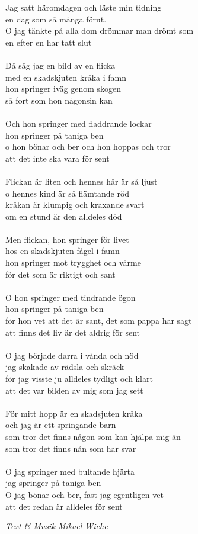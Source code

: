 \vspace{10pt}
Jag satt häromdagen och läste min tidning\\
en dag som så många förut.\\
O jag tänkte på alla dom drömmar man drömt som\\
en efter en har tatt slut\\
\\
Då såg jag en bild av en flicka\\
med en skadskjuten kråka i famn\\
hon springer iväg genom skogen\\
så fort som hon någonsin kan\\
\\
Och hon springer med fladdrande lockar\\
hon springer på taniga ben\\
o hon bönar och ber och hon hoppas och tror\\
att det inte ska vara för sent\\
\\
Flickan är liten och hennes hår är så ljust\\
o hennes kind är så flämtande röd\\
kråkan är klumpig och kraxande svart\\
om en stund är den alldeles död\\
\\
Men flickan, hon springer för livet\\
hos en skadskjuten fågel i famn\\
hon springer mot trygghet och värme\\
för det som är riktigt och sant\\
\\
O hon springer med tindrande ögon\\
hon springer på taniga ben\\
för hon vet att det är sant, det som pappa har sagt\\
att finns det liv är det aldrig för sent\\
\\
O jag började darra i vånda och nöd\\
jag skakade av rädsla och skräck\\
för jag visste ju alldeles tydligt och klart\\
att det var bilden av mig som jag sett\\
\\
För mitt hopp är en skadsjuten kråka\\
och jag är ett springande barn\\
som tror det finns någon som kan hjälpa mig än\\
som tror det finns nån som har svar\\
\\
O jag springer med bultande hjärta\\
jag springer på taniga ben\\
O jag bönar och ber, fast jag egentligen vet\\
att det redan är alldeles för sent
\par
\vspace{10pt}
{\footnotesize\textit{Text \& Musik Mikael Wiehe}}
